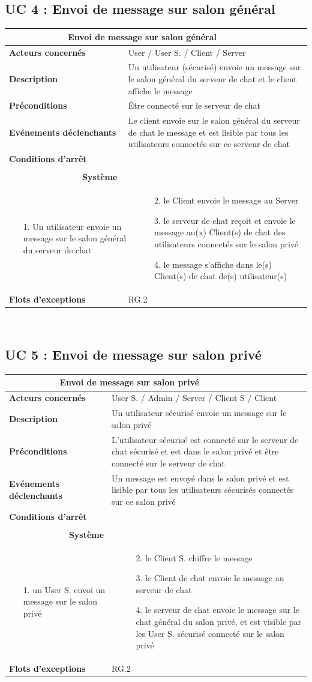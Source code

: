 \documentclass[a4paper,11pt,french]{article}
\newcommand{\fiche}[9] {
	\noindent
\begin{tabular}{|p{3.5cm}| p{1cm} | p{3cm} | p{.5cm} | p{7cm}|} 
\hline
\rowcolor{blue}
\multicolumn{2}{|l|}{\color{white}\bfseries{Nom}} & \multicolumn{3}{l|}{\color{white}\bfseries{#1}}\\
\hline
\multicolumn{2}{|l|}{\bfseries{Acteurs concernés}} & \multicolumn{3}{m{10.5cm}|}{#2}\\
\hline
\multicolumn{2}{|l|}{\bfseries{Description}} & \multicolumn{3}{m{10.5cm}|}{#3}\\
\hline
\multicolumn{2}{|l|}{\bfseries{Préconditions}} & \multicolumn{3}{m{10.5cm}|}{#4}\\
\hline
\multicolumn{2}{|l|}{\bfseries{Evénements déclenchants}} & \multicolumn{3}{m{10.5cm}|}{#5}\\
\hline
\multicolumn{2}{|l|}{\bfseries{Conditions d'arrêt}} & \multicolumn{3}{m{10.5cm}|}{#6}\\
\hline
\rowcolor{gray}
\multicolumn{5}{|c|}{\bfseries{Description du flot d'événements principal}}\\
\hline
\rowcolor{gray}
\multicolumn{3}{|c|}{\bfseries{Acteur(s)}} & \multicolumn{2}{c|}{\bfseries{Système}}\\
\hline
\multicolumn{3}{|p{7.5cm}|}{#7} & \multicolumn{2}{p{7.5cm}|}{#8}\\
\hline
\multicolumn{2}{|l}{\bfseries{Flots d'exceptions}} & \multicolumn{3}{|p{11.5cm}|}{#9}\\
\hline
\end{tabular}
\\
}
\begin{document}
\subsection{UC 4 : Envoi de message sur salon général}

\fiche
	{Envoi de message sur salon général} %
	{User / User S. / Client / Server} %
	{Un utilisateur (sécurisé) envoie un message sur le salon général du serveur de chat et le client affiche le message} %
	{Être connecté sur le serveur de chat } %
	{Le client envoie sur le salon général du serveur de chat le message  et est lisible par tous les utilisateurs connectés sur ce serveur de chat} %
	{} %
	{\begin{itemize}  %
		\item [1.] Un utilisateur envoie un message sur le salon général du serveur de chat
	 \end{itemize}
	} 
	{\begin{itemize}  %
		\item []
		\item [2.] le Client envoie le message au Server
		\item [3.] le serveur de chat reçoit et envoie le message au(x) Client(s) de chat des utilisateurs connectés sur le salon privé
		\item [4.] le message s’affiche dans le(s) Client(s) de chat de(s) utilisateur(s)
	 \end{itemize}
	 }
	{RG.2} %

\subsection{UC 5 : Envoi de message sur salon privé}

\fiche
	{Envoi de message sur salon privé} %
	{User S. / Admin / Server / Client S / Client} %
	{Un utilisateur sécurisé envoie un message sur le salon privé} %
	{L’utilisateur sécurisé est connecté sur le serveur de chat sécurisé et est dans le salon privé et être connecté sur le serveur de chat} %
	{Un message est envoyé dans le salon privé et est lisible par tous les utilisateurs sécurisés connectés sur ce salon privé} %
	{} %
	{\begin{itemize}  %
		\item [1.] un User S. envoi un message sur le salon privé
	 \end{itemize}
	} 
	{\begin{itemize}  %
		\item []
		\item [2.] le Client S. chiffre le message
		\item [3.] le Client de chat envoie le message au serveur de chat
		\item [4.] le serveur de chat envoie le message sur le chat général du salon privé, et est visible par les User S. sécurisé connecté sur le salon privé
	 \end{itemize}
	 }
	{RG.2} %
\end{document}
